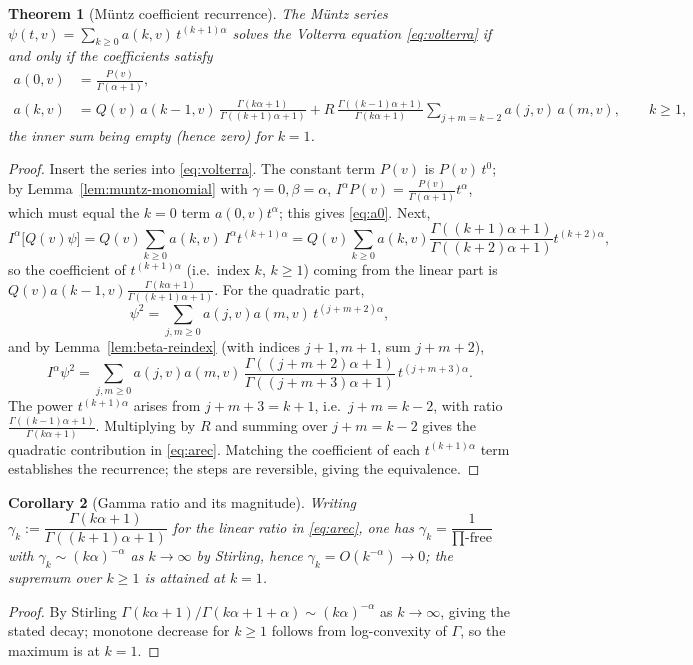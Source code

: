 \documentclass[11pt]{article}
\theoremstyle{plain}
\newtheorem{theorem}{Theorem}[section]
\newtheorem{corollary}[theorem]{Corollary}
\theoremstyle{definition}
\theoremstyle{remark}
\begin{document}
\begin{theorem}[Müntz coefficient recurrence]\label{thm:arec}
The Müntz series $\psi(t,v)=\sum_{k\ge0}a(k,v)\,t^{(k+1)\alpha}$ solves the
Volterra equation \eqref{eq:volterra} if and only if the coefficients satisfy
\begin{align}
   a(0,v)&=\frac{P(v)}{\Gamma(\alpha+1)},\label{eq:a0}\\
   a(k,v)&=Q(v)\,a(k-1,v)\,\frac{\Gamma(k\alpha+1)}{\Gamma((k+1)\alpha+1)}
   +R\,\frac{\Gamma((k-1)\alpha+1)}{\Gamma(k\alpha+1)}
   \!\!\sum_{j+m=k-2}\!\! a(j,v)\,a(m,v),\qquad k\ge1,
   \label{eq:arec}
\end{align}
the inner sum being empty (hence zero) for $k=1$.
\end{theorem}
\begin{proof}
Insert the series into \eqref{eq:volterra}. The constant term $P(v)$ is
$P(v)\,t^0$; by Lemma~\ref{lem:muntz-monomial} with $\gamma=0,\beta=\alpha$,
$I^\alpha P(v)=\frac{P(v)}{\Gamma(\alpha+1)}t^\alpha$, which must equal the
$k=0$ term $a(0,v)t^\alpha$; this gives \eqref{eq:a0}. Next,
\[
   I^\alpha\bigl[Q(v)\psi\bigr]
   =Q(v)\sum_{k\ge0}a(k,v)\,I^\alpha t^{(k+1)\alpha}
   =Q(v)\sum_{k\ge0}a(k,v)\frac{\Gamma((k+1)\alpha+1)}{\Gamma((k+2)\alpha+1)}
      t^{(k+2)\alpha},
\]
so the coefficient of $t^{(k+1)\alpha}$ (i.e.\ index $k$, $k\ge1$) coming from the
linear part is $Q(v)a(k-1,v)\frac{\Gamma(k\alpha+1)}{\Gamma((k+1)\alpha+1)}$.
For the quadratic part,
\[
   \psi^2=\sum_{j,m\ge0}a(j,v)a(m,v)\,t^{(j+m+2)\alpha},
\]
and by Lemma~\ref{lem:beta-reindex} (with indices $j+1,m+1$, sum $j+m+2$),
\[
   I^\alpha\psi^2=\sum_{j,m\ge0}a(j,v)a(m,v)\,
      \frac{\Gamma((j+m+2)\alpha+1)}{\Gamma((j+m+3)\alpha+1)}\,t^{(j+m+3)\alpha}.
\]
The power $t^{(k+1)\alpha}$ arises from $j+m+3=k+1$, i.e.\ $j+m=k-2$, with ratio
$\frac{\Gamma((k-1)\alpha+1)}{\Gamma(k\alpha+1)}$. Multiplying by $R$ and summing
over $j+m=k-2$ gives the quadratic contribution in \eqref{eq:arec}. Matching the
coefficient of each $t^{(k+1)\alpha}$ term establishes the recurrence; the steps
are reversible, giving the equivalence.
\end{proof}

\begin{corollary}[Gamma ratio and its magnitude]\label{cor:gammaratio}
Writing $\gamma_k:=\dfrac{\Gamma(k\alpha+1)}{\Gamma((k+1)\alpha+1)}$ for the linear
ratio in \eqref{eq:arec}, one has $\gamma_k=\dfrac{1}{\prod\text{-free}}$ with
$\gamma_k\sim (k\alpha)^{-\alpha}$ as $k\to\infty$ by Stirling, hence
$\gamma_k=O(k^{-\alpha})\to0$; the supremum over $k\ge1$ is attained at $k=1$.
\end{corollary}
\begin{proof}
By Stirling $\Gamma(k\alpha+1)/\Gamma(k\alpha+1+\alpha)\sim(k\alpha)^{-\alpha}$ as
$k\to\infty$, giving the stated decay; monotone decrease for $k\ge1$ follows from
log-convexity of $\Gamma$, so the maximum is at $k=1$.
\end{proof}
\end{document}
